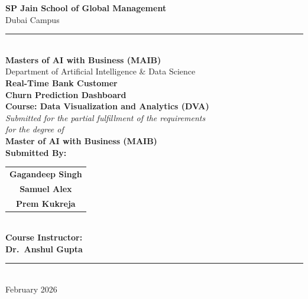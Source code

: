 \documentclass[12pt, a4paper]{report}
\begin{document}
\begin{titlepage}
    \begin{center}
        
        \vspace*{0.5cm}
        
        {\LARGE \textbf{\textcolor{spjblue}{SP Jain School of Global Management}}}\\[0.3cm]
        {\large \textcolor{spjblue}{Dubai Campus}}\\[0.5cm]
        
        \rule{\textwidth}{1.5pt}\\[0.4cm]
        
        {\large \textbf{Masters of AI with Business (MAIB)}}\\[0.2cm]
        {\large Department of Artificial Intelligence \& Data Science}\\[1cm]
        
        {\Huge \textbf{\textcolor{spjblue}{Real-Time Bank Customer\\[0.3cm] Churn Prediction Dashboard}}}\\[1.2cm]
        
        {\Large \textbf{Course: Data Visualization and Analytics (DVA)}}\\[1cm]
        
        {\large \textit{Submitted for the partial fulfillment of the requirements\\[0.2cm]
        for the degree of}}\\[0.4cm]
        {\Large \textbf{Master of AI with Business (MAIB)}}\\[1.2cm]
        
        {\large \textbf{Submitted By:}}\\[0.3cm]
        \begin{tabular}{c}
            \textbf{Gagandeep Singh}\\[0.15cm]
            \textbf{Samuel Alex}\\[0.15cm]
            \textbf{Prem Kukreja}\\
        \end{tabular}\\[1cm]
        
        {\large \textbf{Course Instructor:}}\\[0.2cm]
        {\large \textbf{Dr.\ Anshul Gupta}}\\[1.5cm]
        
        \rule{\textwidth}{1.5pt}\\[0.4cm]
        
        {\large February 2026}
        
    \end{center}
\end{titlepage}
\end{document}
